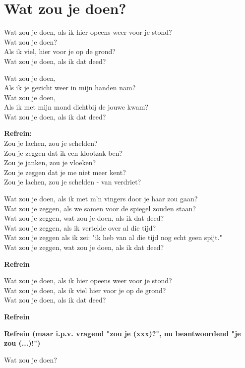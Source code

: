 \section{Wat zou je doen?}
Wat zou je doen, als ik hier opeens weer voor je stond?\\
Wat zou je doen?\\
Als ik viel, hier voor je op de grond?\\
Wat zou je doen, als ik dat deed?

Wat zou je doen,\\
Als ik je gezicht weer in mijn handen nam?\\
Wat zou je doen,\\
Als ik met mijn mond dichtbij de jouwe kwam?\\
Wat zou je doen, als ik dat deed?

\textbf{Refrein:}\\
Zou je lachen, zou je schelden?\\
Zou je zeggen dat ik een klootzak ben?\\
Zou je janken, zou je vloeken?\\
Zou je zeggen dat je me niet meer kent?\\
Zou je lachen, zou je schelden - van verdriet?

Wat zou je doen, als ik met m'n vingers door je haar zou gaan?\\
Wat zou je zeggen, als we samen voor de spiegel zouden staan?\\
Wat zou je zeggen, wat zou je doen, als ik dat deed?\\
Wat zou je zeggen, als ik vertelde over al die tijd?\\
Wat zou je zeggen als ik zei: "ik heb van al die tijd nog echt geen spijt."\\
Wat zou je zeggen, wat zou je doen, als ik dat deed?

\textbf{Refrein}

Wat zou je doen, als ik hier opeens weer voor je stond?\\
Wat zou je doen, als ik viel hier voor je op de grond?\\
Wat zou je doen, als ik dat deed?

\textbf{Refrein}

\textbf{Refrein (maar i.p.v. vragend "zou je (xxx)?", nu beantwoordend "je zou (...)!")}

Wat zou je doen?
